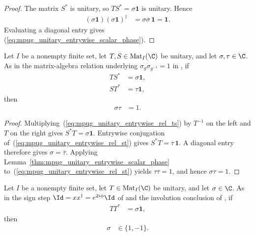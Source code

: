 \begin{proof}\leanok
    The matrix $S^*$ is unitary, so $TS^*=\sigma\mathbf 1$ is unitary. Hence
    \begin{align}
        (\sigma\mathbf 1)(\sigma\mathbf 1)^\dagger
         & =\sigma\overline\sigma\,\mathbf 1=\mathbf 1.
    \end{align}
    Evaluating a diagonal entry gives
    (\ref{eq:mpug_unitary_entrywise_scalar_phase}).
\end{proof}

\begin{lemma}
    \label{thm:mpug_unitary_entrywise_paired_scalars}
    \leanok
    Let $I$ be a nonempty finite set, let $T,S\in\operatorname{Mat}_I(\C)$ be
    unitary, and let $\sigma,\tau\in\C$. As in the matrix-algebra relation
    underlying $\sigma_g\sigma_{g^{-1}}=1$ in
    \cite[lines~1559--1563]{FrancoRubio2025MPUGauging}, if
    \begin{align}
        TS^* & =\sigma\mathbf 1,
        \label{eq:mpug_unitary_entrywise_rel_ts} \\
        ST^* & =\tau\mathbf 1,
        \label{eq:mpug_unitary_entrywise_rel_st}
    \end{align}
    then
    \begin{align}
        \sigma\tau & =1.
        \label{eq:mpug_unitary_entrywise_paired_scalars}
    \end{align}
\end{lemma}

\begin{proof}\leanok
    Multiplying~(\ref{eq:mpug_unitary_entrywise_rel_ts}) by $T^{-1}$ on the left and $T$ on the
    right gives $S^*T=\sigma\mathbf 1$. Entrywise conjugation of~(\ref{eq:mpug_unitary_entrywise_rel_st})
    gives $S^*T=\overline\tau\,\mathbf 1$. A diagonal entry therefore
    gives $\sigma=\overline\tau$. Applying
    Lemma~\ref{thm:mpug_unitary_entrywise_scalar_phase} to~(\ref{eq:mpug_unitary_entrywise_rel_st})
    yields $\tau\overline\tau=1$, and hence $\sigma\tau=1$.
\end{proof}

\begin{lemma}
    \label{thm:mpug_unitary_entrywise_self_sign}
    \leanok
    Let $I$ be a nonempty finite set, let $T\in\operatorname{Mat}_I(\C)$ be
    unitary, and let $\sigma\in\C$. As in the sign step
    $\Id=xx^\dagger=e^{2i\phi}\Id$ of \cite[lines~1036--1038]{Cirac2017MPU} and
    the involution conclusion of
    \cite[lines~1563--1567]{FrancoRubio2025MPUGauging}, if
    \begin{align}
        TT^* & =\sigma\mathbf 1,
        \label{eq:mpug_unitary_entrywise_self_relation}
    \end{align}
    then
    \begin{align}
        \sigma & \in\{1,-1\}.
        \label{eq:mpug_unitary_entrywise_self_sign}
    \end{align}
\end{lemma}

